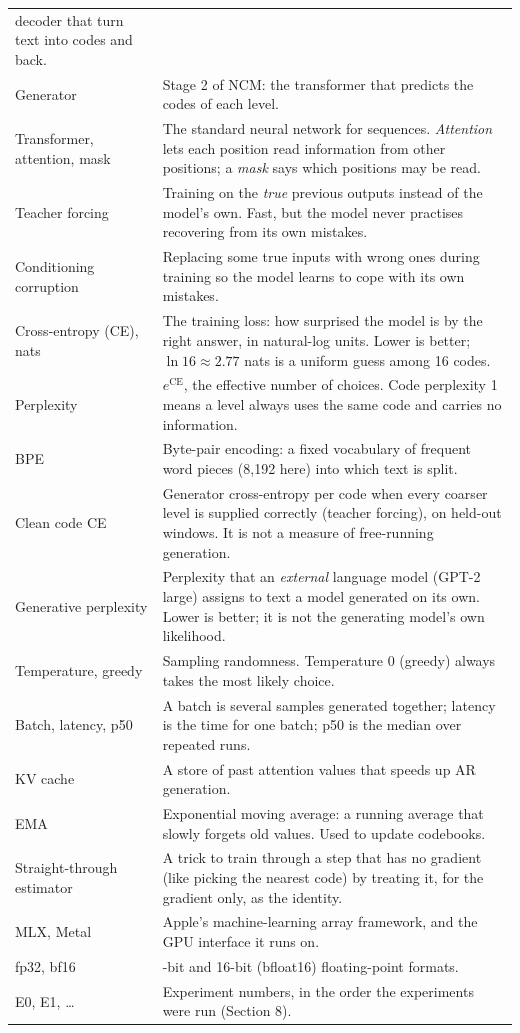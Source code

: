 \documentclass[
  british,
]{article}
\begin{document}
\begin{longtable}[]{@{}
  >{\raggedright\arraybackslash}p{}
  >{\raggedright\arraybackslash}p{}@{}}
decoder that turn text into codes and back. \\
Generator & Stage 2 of NCM: the transformer that predicts the codes of
each level. \\
Transformer, attention, mask & The standard neural network for
sequences. \emph{Attention} lets each position read information from
other positions; a \emph{mask} says which positions may be read. \\
Teacher forcing & Training on the \emph{true} previous outputs instead
of the model's own. Fast, but the model never practises recovering from
its own mistakes. \\
Conditioning corruption & Replacing some true inputs with wrong ones
during training so the model learns to cope with its own mistakes. \\
Cross-entropy (CE), nats & The training loss: how surprised the model is
by the right answer, in natural-log units. Lower is better;
\(\ln 16 \approx 2.77\) nats is a uniform guess among 16 codes. \\
Perplexity & \(e^{\mathrm{CE}}\), the effective number of choices. Code
perplexity 1 means a level always uses the same code and carries no
information. \\
BPE & Byte-pair encoding: a fixed vocabulary of frequent word pieces
(8,192 here) into which text is split. \\
Clean code CE & Generator cross-entropy per code when every coarser
level is supplied correctly (teacher forcing), on held-out windows. It
is not a measure of free-running generation. \\
Generative perplexity & Perplexity that an \emph{external} language
model (GPT-2 large) assigns to text a model generated on its own. Lower
is better; it is not the generating model's own likelihood. \\
Temperature, greedy & Sampling randomness. Temperature 0 (greedy) always
takes the most likely choice. \\
Batch, latency, p50 & A batch is several samples generated together;
latency is the time for one batch; p50 is the median over repeated
runs. \\
KV cache & A store of past attention values that speeds up AR
generation. \\
EMA & Exponential moving average: a running average that slowly forgets
old values. Used to update codebooks. \\
Straight-through estimator & A trick to train through a step that has no
gradient (like picking the nearest code) by treating it, for the
gradient only, as the identity. \\
MLX, Metal & Apple's machine-learning array framework, and the GPU
interface it runs on. \\
fp32, bf16 & 32-bit and 16-bit (bfloat16) floating-point formats. \\
E0, E1, \ldots{} & Experiment numbers, in the order the experiments were
run (Section 8). \\
\end{longtable}
\end{document}

